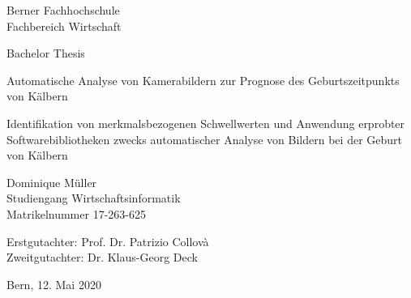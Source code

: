 
\begin{titlepage}
	
	\begin{center}

		\small{\hspace{2cm}Berner Fachhochschule\\
			\hspace{2cm}Fachbereich Wirtschaft\\}
		
		\vspace{0.75cm}
		\large{\hspace{2cm}\textrm{Bachelor Thesis }}
		\vspace{0.75cm}
		
		\Huge{\hspace{2cm} Automatische Analyse von Kamerabildern zur Prognose des Geburtszeitpunkts von Kälbern\\}
		
		\vspace{1cm}
		\LARGE{\hspace{2cm}Identifikation von merkmalsbezogenen Schwellwerten und  Anwendung erprobter Softwarebibliotheken zwecks automatischer Analyse von Bildern bei der Geburt von Kälbern   \\
		\vspace{1.75cm}	
			
			
			\LARGE{\hspace{2cm}Dominique Müller}\\
			\vspace{1cm}
			\large{\hspace{2cm}Studiengang Wirtschaftsinformatik\\
				\hspace{2cm}Matrikelnummer 17-263-625}
			
			\vspace{1cm}
			\large\hspace{2cm}Erstgutachter: Prof. Dr. Patrizio Collovà\\
			\large\hspace{2cm}Zweitgutachter: Dr. Klaus-Georg Deck\\}
			\vspace{1cm}
			
			\hspace{2cm} \large{Bern, 12. Mai 2020} \\

		
		
	\end{center}
	
\end{titlepage}

